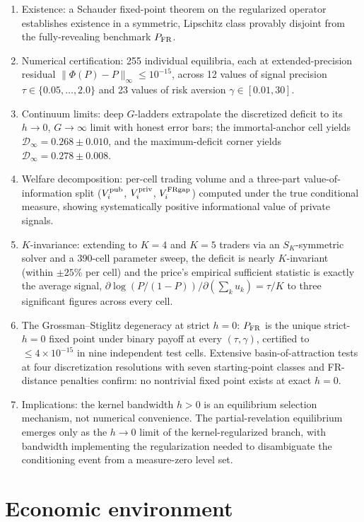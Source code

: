 \documentclass[11pt]{article}
\newcommand{\1}{\mathbf{1}}
\newcommand{\deficit}{\mathcal{D}}
\newcommand{\Vipub}{V_{i}^{\rm pub}}
\newcommand{\Vipriv}{V_{i}^{\rm priv}}
\newcommand{\ViFR}{V_{i}^{\rm FRgap}}
\newcommand{\PFR}{P_{\rm FR}}
\begin{document}
\begin{enumerate}
\item Existence: a Schauder fixed-point theorem on the regularized
operator establishes existence in a symmetric, Lipschitz class
provably disjoint from the fully-revealing benchmark $\PFR$.
\item Numerical certification: 255 individual equilibria, each at
extended-precision residual $\|\Phi(P)-P\|_\infty \le 10^{-15}$, across
12 values of signal precision $\tau\in\{0.05,\ldots,2.0\}$ and 23 values
of risk aversion $\gamma\in[0.01,30]$.
\item Continuum limits: deep $G$-ladders extrapolate the discretized
deficit to its $h\to0$, $G\to\infty$ limit with honest error bars; the
immortal-anchor cell yields $\deficit_\infty=0.268\pm0.010$, and the
maximum-deficit corner yields $\deficit_\infty=0.278\pm0.008$.
\item Welfare decomposition: per-cell trading volume and a three-part
value-of-information split ($\Vipub$, $\Vipriv$, $\ViFR$) computed under
the true conditional measure, showing systematically positive
informational value of private signals.
\item $K$-invariance: extending to $K=4$ and $K=5$ traders via an
$S_K$-symmetric solver and a 390-cell parameter sweep, the deficit is
nearly $K$-invariant (within $\pm 25\%$ per cell) and the price's
empirical sufficient statistic is exactly the average signal,
$\partial\log{(P/(1-P))}/\partial(\sum_k u_k) = \tau/K$ to three
significant figures across every cell.
\item The Grossman--Stiglitz degeneracy at strict $h{=}0$: $\PFR$ is the
unique strict-$h{=}0$ fixed point under binary payoff at every $(\tau,
\gamma)$, certified to $\le 4\times 10^{-15}$ in nine independent test
cells.  Extensive basin-of-attraction tests at four discretization
resolutions with seven starting-point classes and FR-distance penalties
confirm: no nontrivial fixed point exists at exact $h=0$.
\item Implications: the kernel bandwidth $h>0$ is an equilibrium
selection mechanism, not numerical convenience.  The partial-revelation
equilibrium emerges only as the $h\to 0$ limit of the kernel-regularized
branch, with bandwidth implementing the regularization needed to
disambiguate the conditioning event from a measure-zero level set.
\end{enumerate}

\section{Economic environment}
\label{sec:env}
\end{document}

